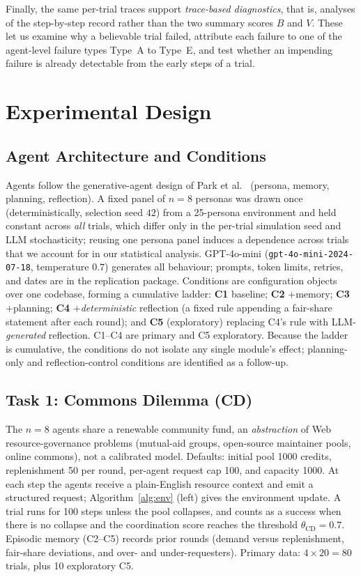 \documentclass[runningheads]{llncs}
\begin{document}
Finally, the same per-trial traces support \emph{trace-based diagnostics}, that is, analyses of the
step-by-step record rather than the two summary scores $B$ and $V$. These let us examine why a
believable trial failed, attribute each failure to one of the agent-level failure types Type~A to
Type~E, and test whether an impending failure is already detectable from the early steps of a trial.




\section{Experimental Design}\label{sec:design}

\subsection{Agent Architecture and Conditions}
Agents follow the generative-agent design of Park et al.~\cite{park2023generative} (persona,
memory, planning, reflection). A fixed panel of $n=8$ personas was drawn once (deterministically,
selection seed $42$) from a 25-persona environment and held constant across \emph{all} trials,
which differ only in the per-trial simulation seed and LLM stochasticity; reusing one persona
panel induces a dependence across trials that we account for in our statistical analysis.
GPT-4o-mini (\texttt{gpt-4o-mini-2024-07-18}, temperature $0.7$) generates all behaviour; prompts,
token limits, retries, and dates are in the replication package. Conditions are configuration
objects over one codebase, forming a cumulative ladder: \textbf{C1} baseline; \textbf{C2}
$+$memory; \textbf{C3} $+$planning; \textbf{C4} $+$\emph{deterministic} reflection (a fixed rule
appending a fair-share statement after each round); and \textbf{C5} (exploratory) replacing C4's
rule with LLM-\emph{generated} reflection. C1--C4 are primary and C5 exploratory. Because the
ladder is cumulative, the conditions do not isolate any single module's effect; planning-only and
reflection-control conditions are identified as a follow-up.




\subsection{Task 1: Commons Dilemma (CD)}
The $n=8$ agents share a renewable community fund, an \emph{abstraction} of Web
resource-governance problems (mutual-aid groups, open-source maintainer pools, online commons),
not a calibrated model. Defaults: initial pool 1000 credits, replenishment 50 per round,
per-agent request cap 100, and capacity 1000. At each step the agents receive a plain-English
resource context and emit a structured request; Algorithm~\ref{alg:env} (left) gives the
environment update. A trial runs for 100 steps unless the pool collapses, and counts as a success
when there is no collapse and the coordination score reaches the threshold $\theta_{\mathrm{CD}}=0.7$.
Episodic memory (C2--C5) records prior rounds (demand versus replenishment, fair-share deviations,
and over- and under-requesters). Primary data: $4 \times 20 = 80$ trials, plus 10 exploratory C5.
\end{document}
